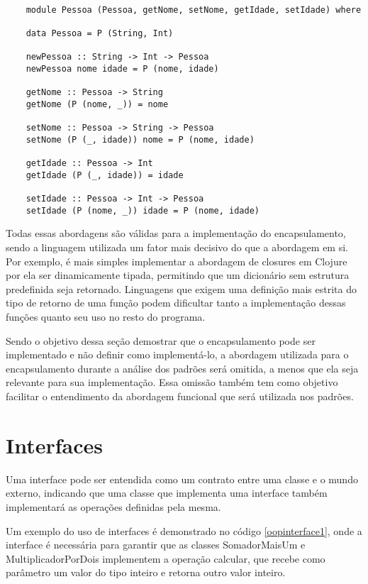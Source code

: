 \begin{lstlisting}[caption={Módulos como forma de encapsulamento},label=modulesencap]
    
    module Pessoa (Pessoa, getNome, setNome, getIdade, setIdade) where

    data Pessoa = P (String, Int)

    newPessoa :: String -> Int -> Pessoa
    newPessoa nome idade = P (nome, idade)

    getNome :: Pessoa -> String
    getNome (P (nome, _)) = nome

    setNome :: Pessoa -> String -> Pessoa
    setNome (P (_, idade)) nome = P (nome, idade)

    getIdade :: Pessoa -> Int
    getIdade (P (_, idade)) = idade

    setIdade :: Pessoa -> Int -> Pessoa
    setIdade (P (nome, _)) idade = P (nome, idade)

\end{lstlisting}

Todas essas abordagens são válidas para a 
implementação do encapsulamento, sendo a 
linguagem utilizada um fator mais decisivo 
do que a abordagem em si. Por exemplo, é 
mais simples implementar a abordagem de closures 
em Clojure por ela ser dinamicamente tipada, 
permitindo que um dicionário sem estrutura 
predefinida seja retornado. Linguagens que exigem 
uma definição mais estrita do tipo de retorno 
de uma função podem dificultar tanto a 
implementação dessas funções quanto seu uso 
no resto do programa.

Sendo o objetivo dessa seção demostrar que 
o encapsulamento pode ser implementado e 
não definir como implementá-lo, 
a abordagem utilizada para o encapsulamento 
durante a análise dos padrões será 
omitida, a menos que ela seja relevante para 
sua implementação. Essa omissão 
também tem como objetivo facilitar o entendimento 
da abordagem funcional que será utilizada nos padrões. 

\section{Interfaces}

Uma interface pode ser entendida como um contrato 
entre uma classe e o mundo externo, indicando que 
uma classe que implementa uma interface também 
implementará as operações definidas 
pela mesma\cite{oracleooconcepts}. 

Um exemplo do uso de interfaces é demonstrado no código 
\ref{oopinterface1}, 
onde a interface é necessária para garantir que as 
classes SomadorMaisUm e MultiplicadorPorDois implementem 
a operação calcular, que recebe como parâmetro 
um valor do tipo inteiro e retorna outro valor 
inteiro.


